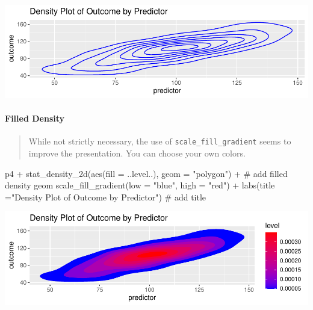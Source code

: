\documentclass[12pt,]{article}
\newenvironment{Shaded}{}{}
\newcommand{\CommentTok}[1]{\textcolor[rgb]{0.00,0.50,0.00}{#1}}
\newcommand{\DataTypeTok}[1]{#1}
\newcommand{\KeywordTok}[1]{\textcolor[rgb]{0.00,0.00,1.00}{#1}}
\newcommand{\NormalTok}[1]{#1}
\newcommand{\OperatorTok}[1]{#1}
\newcommand{\StringTok}[1]{\textcolor[rgb]{0.00,0.50,0.50}{#1}}
\let\oldparagraph\paragraph
\renewcommand{\paragraph}[1]{\oldparagraph{#1}\mbox{}}
\begin{document}
\includegraphics{introduction-to-ggplot2_files/figure-latex/unnamed-chunk-19-1.pdf}

\hypertarget{filled-density}{%
\paragraph{Filled Density}\label{filled-density}}

\begin{quote}
While not strictly necessary, the use of \texttt{scale\_fill\_gradient}
seems to improve the presentation. You can choose your own colors.
\end{quote}

\begin{Shaded}
\begin{Highlighting}[]
\NormalTok{p4 }\OperatorTok{+}\StringTok{ }
\StringTok{  }\KeywordTok{stat_density_2d}\NormalTok{(}\KeywordTok{aes}\NormalTok{(}\DataTypeTok{fill =}\NormalTok{ ..level..), }
                  \DataTypeTok{geom =} \StringTok{"polygon"}\NormalTok{) }\OperatorTok{+}\StringTok{ }\CommentTok{# add filled density geom }
\StringTok{  }\KeywordTok{scale_fill_gradient}\NormalTok{(}\DataTypeTok{low =} \StringTok{"blue"}\NormalTok{,}
                      \DataTypeTok{high =} \StringTok{"red"}\NormalTok{) }\OperatorTok{+}
\StringTok{  }\KeywordTok{labs}\NormalTok{(}\DataTypeTok{title =}\StringTok{"Density Plot of Outcome by Predictor"}\NormalTok{) }\CommentTok{# add title}
\end{Highlighting}
\end{Shaded}

\includegraphics{introduction-to-ggplot2_files/figure-latex/unnamed-chunk-20-1.pdf}
\end{document}
